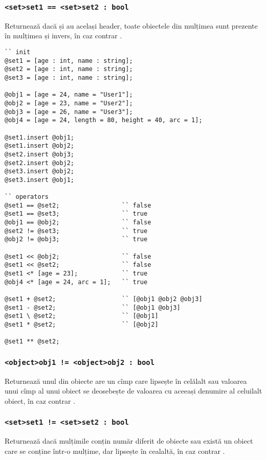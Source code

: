 \subsubsection{\lstinline|<set>set1 == <set>set2 : bool|}

Returnează \true{} dacă  și  au același header, toate obiectele din mulțimea  sunt prezente în mulțimea  și invers, în caz contrar \false{}.

\begin{lstlisting}[caption=Exemple de folosire al operatorilor asupra tipului object și set, label=setobjopex]
`` init
@set1 = [age : int, name : string];
@set2 = [age : int, name : string];
@set3 = [age : int, name : string];

@obj1 = [age = 24, name = "User1"];
@obj2 = [age = 23, name = "User2"];
@obj3 = [age = 26, name = "User3"];
@obj4 = [age = 24, length = 80, height = 40, arc = 1];

@set1.insert @obj1;
@set1.insert @obj2;
@set2.insert @obj3;
@set2.insert @obj2;
@set3.insert @obj2;
@set3.insert @obj1;

`` operators
@set1 == @set2;					`` false
@set1 == @set3;					`` true
@obj1 == @obj2;					`` false
@set2 != @set3;					`` true
@obj2 != @obj3;					`` true

@set1 << @obj2;					`` false
@set1 << @set2;					`` false
@set1 <* [age = 23];			`` true
@obj4 <* [age = 24, arc = 1];	`` true

@set1 + @set2;					`` [@obj1 @obj2 @obj3]
@set1 - @set2;					`` [@obj1 @obj3]
@set1 \ @set2;					`` [@obj1]
@set1 * @set2;					`` [@obj2]

@set1 ** @set2;	
\end{lstlisting}

\subsubsection{\lstinline|<object>obj1 != <object>obj2 : bool|}

Returnează \true{} unul din obiecte are un cîmp care lipsește în celălalt sau valoarea unui cîmp al unui obiect se deosebește de valoarea cu aceeași denumire al celuilalt obiect, în caz contrar \false{}.

\subsubsection{\lstinline|<set>set1 != <set>set2 : bool|}

Returnează \true{} dacă mulțimile conțin număr diferit de obiecte sau există un obiect care se conține într-o mulțime, dar lipsește în cealaltă, în caz contrar \false{}.

